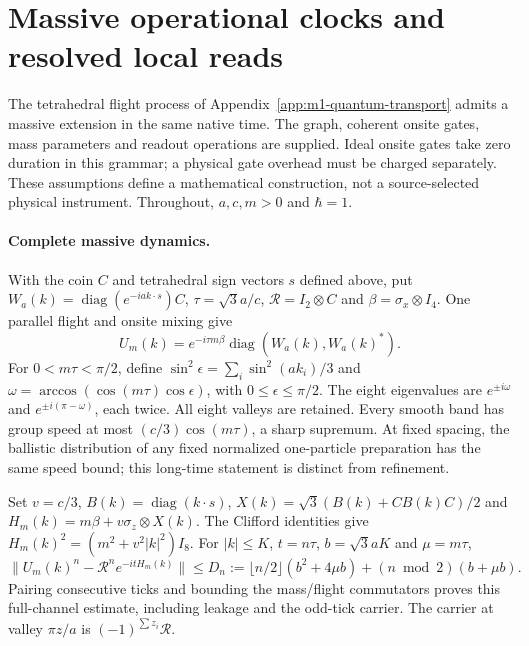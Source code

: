 \section{Massive operational clocks and resolved local reads}
\label{app:massive-operational-clocks}

The tetrahedral flight process of Appendix~\ref{app:m1-quantum-transport}
admits a massive extension in the same native time. The graph, coherent
onsite gates, mass parameters and readout operations are supplied. Ideal
onsite gates take zero duration in this grammar; a physical gate overhead
must be charged separately. These assumptions define a mathematical
construction, not a source-selected physical instrument. Throughout,
$a,c,m>0$ and $\hbar=1$.

\paragraph{Complete massive dynamics.}
With the coin $C$ and tetrahedral sign vectors $s$ defined above, put
$W_a(k)=\operatorname{diag}(e^{-ia k\cdot s})C$,
$\tau=\sqrt3a/c$, $\mathcal R=I_2\otimes C$ and
$\beta=\sigma_x\otimes I_4$. One parallel flight and onsite mixing give
\[
 U_m(k)=e^{-i\tau m\beta}\operatorname{diag}(W_a(k),W_a(k)^*).
\]
For $0<m\tau<\pi/2$, define
$\sin^2\epsilon=\sum_i\sin^2(ak_i)/3$ and
$\omega=\arccos(\cos(m\tau)\cos\epsilon)$, with
$0\le\epsilon\le\pi/2$. The eight eigenvalues are
$e^{\pm i\omega}$ and $e^{\pm i(\pi-\omega)}$, each twice.
All eight valleys are retained. Every smooth band has group speed at most
$(c/3)\cos(m\tau)$, a sharp supremum. At fixed spacing, the ballistic
distribution of any fixed normalized one-particle preparation has the
same speed bound; this long-time statement is distinct from refinement.

Set $v=c/3$, $B(k)=\operatorname{diag}(k\cdot s)$,
$X(k)=\sqrt3(B(k)+CB(k)C)/2$ and
$H_m(k)=m\beta+v\sigma_z\otimes X(k)$.
The Clifford identities give $H_m(k)^2=(m^2+v^2|k|^2)I_8$.
For $|k|\le K$, $t=n\tau$, $b=\sqrt3aK$ and $\mu=m\tau$,
\[
 \|U_m(k)^n-\mathcal R^n e^{-itH_m(k)}\|
 \le D_n:=\lfloor n/2\rfloor(b^2+4\mu b)
                  +(n\bmod2)(b+\mu b).
 \tag{MC1}
\]
Pairing consecutive ticks and bounding the mass/flight commutators proves
this full-channel estimate, including leakage and the odd-tick carrier.
The carrier at valley $\pi z/a$ is $(-1)^{\sum z_i}\mathcal R$.

